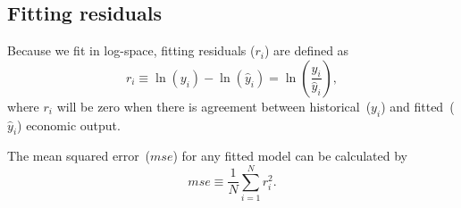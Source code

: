 \documentclass[preprint,authoryear,12pt]{elsarticle}\usepackage[]{graphicx}\usepackage[]{color}
\begin{document}
\subsection{Fitting residuals} 
\label{sec:fitting_residuals}



Because we fit in log-space, fitting residuals ($r_i$) are defined as
%
\begin{equation} \label{eq:log-residuals}
  r_i \equiv \ln(y_i) - \ln(\hat{y}_i) =\ln\left( \frac{y_i}{\hat{y}_i} \right), 
\end{equation}
%
where $r_i$ will be zero when there is agreement between 
historical~($y_i$) and fitted~($\hat{y}_i$) economic output.

The mean squared error~($mse$) for any fitted model can be calculated by
%
\begin{equation} \label{eq:mse}
  mse \equiv \frac{1}{N} \sum_{i=1}^N{r_i^2} .
\end{equation}
\end{document}
